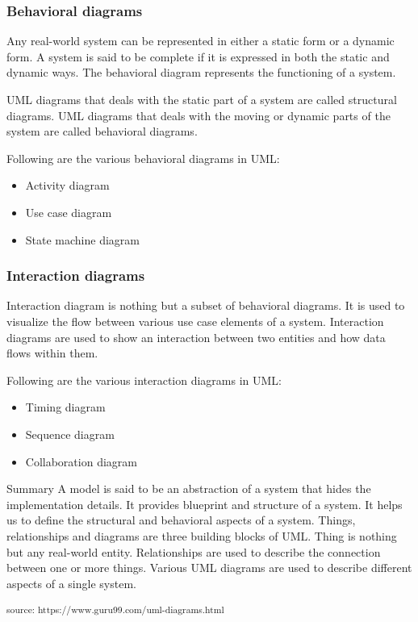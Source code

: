 \documentclass[
]{article}
\providecommand{\tightlist}{%
  \setlength{\itemsep}{0pt}\setlength{\parskip}{0pt}}
\begin{document}
\hypertarget{behavioral-diagrams-1}{%
\subsubsection{Behavioral diagrams}\label{behavioral-diagrams-1}}

Any real-world system can be represented in either a static form or a
dynamic form. A system is said to be complete if it is expressed in both
the static and dynamic ways. The behavioral diagram represents the
functioning of a system.

UML diagrams that deals with the static part of a system are called
structural diagrams. UML diagrams that deals with the moving or dynamic
parts of the system are called behavioral diagrams.

Following are the various behavioral diagrams in UML:

\begin{itemize}
\tightlist
\item
  Activity diagram
\item
  Use case diagram
\item
  State machine diagram
\end{itemize}

\hypertarget{interaction-diagrams-1}{%
\subsubsection{Interaction diagrams}\label{interaction-diagrams-1}}

Interaction diagram is nothing but a subset of behavioral diagrams. It
is used to visualize the flow between various use case elements of a
system. Interaction diagrams are used to show an interaction between two
entities and how data flows within them.

Following are the various interaction diagrams in UML:

\begin{itemize}
\tightlist
\item
  Timing diagram
\item
  Sequence diagram
\item
  Collaboration diagram
\end{itemize}

Summary A model is said to be an abstraction of a system that hides the
implementation details. It provides blueprint and structure of a system.
It helps us to define the structural and behavioral aspects of a system.
Things, relationships and diagrams are three building blocks of UML.
Thing is nothing but any real-world entity. Relationships are used to
describe the connection between one or more things. Various UML diagrams
are used to describe different aspects of a single system.

\textsuperscript{source: https://www.guru99.com/uml-diagrams.html}
\end{document}
